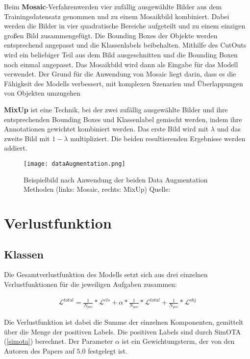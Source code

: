 Beim \textbf{Mosaic}-Verfahrenwerden vier zufällig ausgewählte Bilder aus dem Trainingsdatensatz genommen und zu einem Mosaikbild kombiniert. Dabei werden die Bilder in vier quadratische Bereiche aufgeteilt und zu einem einzigen großen Bild zusammengefügt. Die Bounding Boxes der Objekte werden entsprechend angepasst und die Klassenlabels beibehalten. Mithilfe des CutOuts wird ein beliebiger Teil aus dem Bild ausgeschnitten und die Bounding Boxen noch einmal angepasst. Das Mosaikbild wird dann als Eingabe für das Modell verwendet. Der Grund für die Anwendung von Mosaic liegt darin, dass es die Fähigkeit des Modells verbessert, mit komplexen Szenarien und Überlappungen von Objekten umzugehen

\textbf{MixUp} ist eine Technik, bei der zwei zufällig ausgewählte Bilder und ihre entsprechenden Bounding Boxes und Klassenlabel gemischt werden, indem ihre Annotationen gewichtet kombiniert werden. Das erste Bild wird mit $\lambda$ und das zweite Bild mit $1-\lambda$ multipliziert. Die beiden resultierenden Ergebnisse werden addiert. \cite{yoloxExplanationAug}

\begin{figure}[h]
	\centering
	\texttt{[image: dataAugmentation.png]}
	\caption[Beispielbild nach Anwendung der beiden Data Augmentation Methoden]{Beispielbild nach Anwendung der beiden Data Augmentation Methoden (links: Mosaic, rechts: MixUp) Quelle: \cite{yoloxExplanationAug}}
	\label{fig:yoloxExplanationAug}
\end{figure}



\section{Verlustfunktion}
\subsection{Klassen}
Die Gesamtverlustfunktion des Modells setzt sich aus drei einzelnen Verlustfunktionen für die jeweiligen Aufgaben zusammen:

\begin{align}
	\mathcal{L}^{total}=\frac{1}{N_{pos}}*\mathcal{L}^{cls}+\alpha*\frac{1}{N_{pos}}*	\mathcal{L}^{total}+	\frac{1}{N_{pos}}*\mathcal{L}^{obj}
\end{align}

Die Verlustfunktion ist dabei die Summe der einzelnen Komponenten, gemittelt über die Menge der positiven Labels. Die positiven Labels sind durch SimOTA (\ref{simota}) berechnet. Der Parameter $\alpha$ ist ein Gewichtungsterm, der von den Autoren des Papers auf $5.0$ festgelegt ist.

